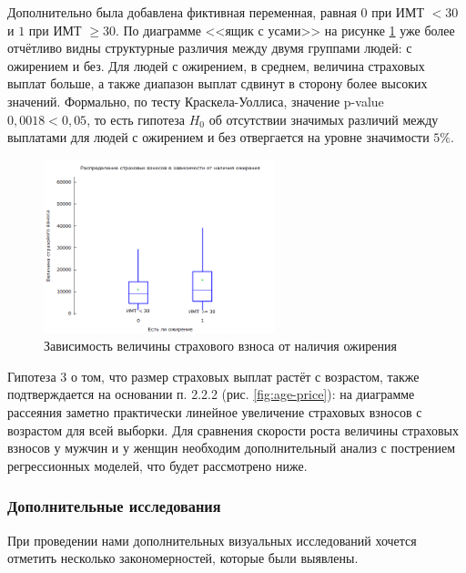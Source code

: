 \documentclass[a4paper,12pt]{article}
\begin{document}
Дополнительно была добавлена фиктивная переменная, равная $0$ при ИМТ $<30$ и $1$ при ИМТ $\ge30$. По диаграмме <<ящик с усами>> на рисунке \ref{fig:is_fat} уже более отчётливо видны структурные различия между двумя группами людей: с ожирением и без. Для людей с ожирением, в среднем, величина страховых выплат больше, а также диапазон выплат сдвинут в сторону более высоких значений. Формально, по тесту Краскела-Уоллиса, значение p-value $0,0018 < 0,05$, то есть гипотеза $H_0$ об отсутствии значимых различий между выплатами для людей с ожирением и без отвергается на уровне значимости $5\%.$

\begin{figure}[H]
	\includegraphics[width=0.6\textwidth]{../[graphics]/is_fat.png}
	\centering
	\caption{Зависимость величины страхового взноса от наличия ожирения}
	\label{fig:is_fat}
\end{figure}

Гипотеза 3 о том, что размер страховых выплат растёт с возрастом, также подтверждается на основании п. 2.2.2 (рис. \ref{fig:age-price}): на диаграмме рассеяния заметно практически линейное увеличение страховых взносов с возрастом для всей выборки. Для сравнения скорости роста величины страховых взносов у мужчин и у женщин необходим дополнительный анализ с пострением регрессионных моделей, что будет рассмотрено ниже.

\subsubsection{Дополнительные исследования}

При проведении нами дополнительных визуальных исследований хочется отметить несколько закономерностей, которые были выявлены.
\end{document}
